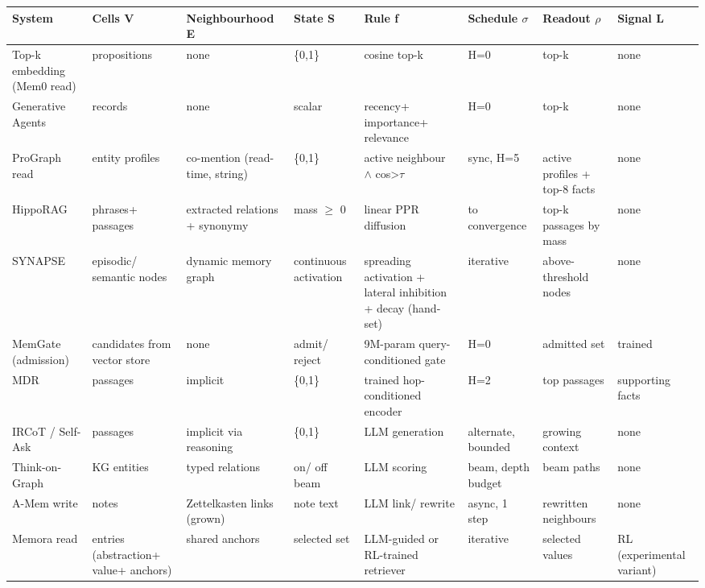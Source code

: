 \documentclass[11pt]{article}
\begin{document}
\begin{table}[!tp]
\centering\scriptsize
\setlength{\tabcolsep}{3pt}
\begin{tabular}{>{\raggedright\arraybackslash}p{}>{\raggedright\arraybackslash}p{}>{\raggedright\arraybackslash}p{}>{\raggedright\arraybackslash}p{}>{\raggedright\arraybackslash}p{}>{\raggedright\arraybackslash}p{}>{\raggedright\arraybackslash}p{}>{\raggedright\arraybackslash}p{}}
\toprule
System & Cells V & Neighbourhood E & State S & Rule f & Schedule $\sigma$ & Readout $\rho$ & Signal L \\
\midrule
Top-k embedding (Mem0 read) & propositions & none & \{0,1\} & cosine top-k & H=0 & top-k & none \\
Generative Agents & records & none & scalar & recency+ importance+ relevance & H=0 & top-k & none \\
ProGraph read & entity profiles & co-mention (read-time, string) & \{0,1\} & active neighbour $\wedge$ cos>$\tau$ & sync, H=5 & active profiles +  top-8 facts & none \\
HippoRAG & phrases+ passages & extracted relations +  synonymy & mass $\geq$ 0 & linear PPR diffusion & to convergence & top-k passages by mass & none \\
SYNAPSE & episodic/ semantic nodes & dynamic memory graph & continuous activation & spreading activation +  lateral inhibition +  decay (hand-set) & iterative & above-threshold nodes & none \\
MemGate (admission) & candidates from vector store & none & admit/ reject & 9M-param query-conditioned gate & H=0 & admitted set & trained \\
MDR & passages & implicit & \{0,1\} & trained hop-conditioned encoder & H=2 & top passages & supporting facts \\
IRCoT /  Self-Ask & passages & implicit via reasoning & \{0,1\} & LLM generation & alternate, bounded & growing context & none \\
Think-on-Graph & KG entities & typed relations & on/ off beam & LLM scoring & beam, depth budget & beam paths & none \\
A-Mem write & notes & Zettelkasten links (grown) & note text & LLM link/ rewrite & async, 1 step & rewritten neighbours & none \\
Memora read & entries (abstraction+ value+ anchors) & shared anchors & selected set & LLM-guided or RL-trained retriever & iterative & selected values & RL (experimental variant) \\

\end{tabular}
\end{table}
\end{document}
